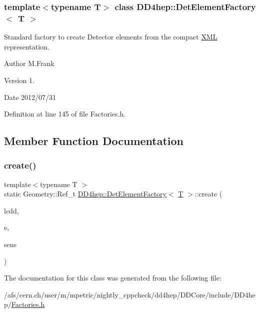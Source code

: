 \subsubsection*{template$<$typename T$>$\newline
class D\+D4hep\+::\+Det\+Element\+Factory$<$ T $>$}

Standard factory to create Detector elements from the compact \hyperlink{namespace_d_d4hep_1_1_x_m_l}{X\+ML} representation. 

\begin{DoxyAuthor}{Author}
M.\+Frank 
\end{DoxyAuthor}
\begin{DoxyVersion}{Version}
1. 
\end{DoxyVersion}
\begin{DoxyDate}{Date}
2012/07/31 
\end{DoxyDate}


Definition at line 145 of file Factories.\+h.



\subsection{Member Function Documentation}
\hypertarget{class_d_d4hep_1_1_det_element_factory_aaf2f69411f75e9d157627298c3c5fb95}{}\label{class_d_d4hep_1_1_det_element_factory_aaf2f69411f75e9d157627298c3c5fb95} 
\subsubsection{\texorpdfstring{create()}{create()}}
{\footnotesize\ttfamily template$<$typename T $>$ \\
static Geometry\+::\+Ref\+\_\+t \hyperlink{class_d_d4hep_1_1_det_element_factory}{D\+D4hep\+::\+Det\+Element\+Factory}$<$ \hyperlink{class_t}{T} $>$\+::create (\begin{DoxyParamCaption}\item[{\hyperlink{class_d_d4hep_1_1_geometry_1_1_l_c_d_d}{Geometry\+::\+L\+C\+DD} \&}]{lcdd,  }\item[{\hyperlink{class_d_d4hep_1_1_x_m_l_1_1_handle__t}{X\+M\+L\+::\+Handle\+\_\+t}}]{e,  }\item[{Geometry\+::\+Ref\+\_\+t}]{sens }\end{DoxyParamCaption})\hspace{0.3cm}{\ttfamily [static]}}



The documentation for this class was generated from the following file\+:\begin{DoxyCompactItemize}
\item 
/afs/cern.\+ch/user/m/mpetric/nightly\+\_\+cppcheck/dd4hep/\+D\+D\+Core/include/\+D\+D4hep/\hyperlink{_d_d_core_2include_2_d_d4hep_2_factories_8h}{Factories.\+h}\end{DoxyCompactItemize}
